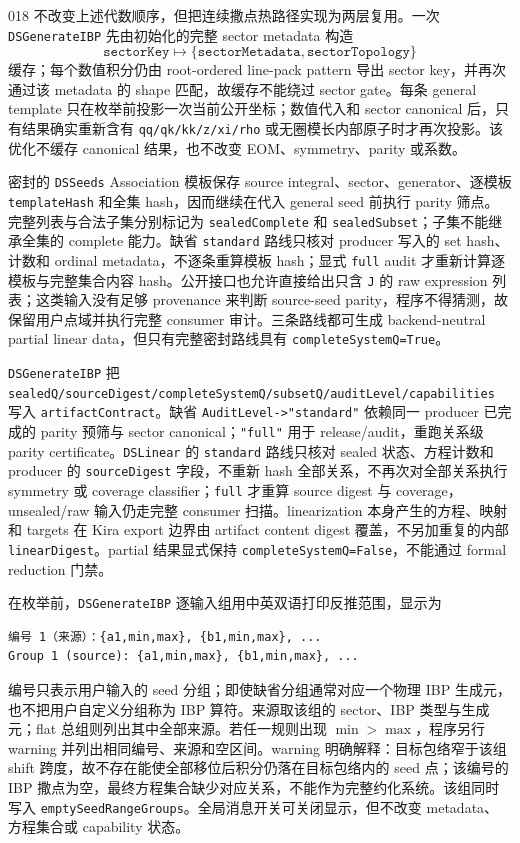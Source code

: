 ﻿\documentclass[a4paper,11pt]{article}
\begin{document}
018 不改变上述代数顺序，但把连续撒点热路径实现为两层复用。一次 \texttt{DSGenerateIBP} 先由初始化的完整 sector metadata 构造
\begin{equation}
 \texttt{sectorKey}\longmapsto\{\texttt{sectorMetadata},\texttt{sectorTopology}\}
\end{equation}
缓存；每个数值积分仍由 root-ordered line-pack pattern 导出 sector key，并再次通过该 metadata 的 shape 匹配，故缓存不能绕过 sector gate。每条 general template 只在枚举前投影一次当前公开坐标；数值代入和 sector canonical 后，只有结果确实重新含有 \texttt{qq/qk/kk/z/xi/rho} 或无圈模长内部原子时才再次投影。该优化不缓存 canonical 结果，也不改变 EOM、symmetry、parity 或系数。

密封的 \texttt{DSSeeds} Association 模板保存 source integral、sector、generator、逐模板 \texttt{templateHash} 和全集 hash，因而继续在代入 general seed 前执行 parity 筛点。完整列表与合法子集分别标记为 \texttt{sealedComplete} 和 \texttt{sealedSubset}；子集不能继承全集的 complete 能力。缺省 \texttt{standard} 路线只核对 producer 写入的 set hash、计数和 ordinal metadata，不逐条重算模板 hash；显式 \texttt{full} audit 才重新计算逐模板与完整集合内容 hash。公开接口也允许直接给出只含 \texttt{J} 的 raw expression 列表；这类输入没有足够 provenance 来判断 source-seed parity，程序不得猜测，故保留用户点域并执行完整 consumer 审计。三条路线都可生成 backend-neutral partial linear data，但只有完整密封路线具有 \texttt{completeSystemQ=True}。

\texttt{DSGenerateIBP} 把 \texttt{sealedQ/sourceDigest/completeSystemQ/subsetQ/auditLevel/capabilities} 写入 \texttt{artifactContract}。缺省 \texttt{AuditLevel->"standard"} 依赖同一 producer 已完成的 parity 预筛与 sector canonical；\texttt{"full"} 用于 release/audit，重跑关系级 parity certificate。\texttt{DSLinear} 的 \texttt{standard} 路线只核对 sealed 状态、方程计数和 producer 的 \texttt{sourceDigest} 字段，不重新 hash 全部关系，不再次对全部关系执行 symmetry 或 coverage classifier；\texttt{full} 才重算 source digest 与 coverage，unsealed/raw 输入仍走完整 consumer 扫描。linearization 本身产生的方程、映射和 targets 在 Kira export 边界由 artifact content digest 覆盖，不另加重复的内部 \texttt{linearDigest}。partial 结果显式保持 \texttt{completeSystemQ=False}，不能通过 formal reduction 门禁。

在枚举前，\texttt{DSGenerateIBP} 逐输入组用中英双语打印反推范围，显示为
\begin{verbatim}
编号 1（来源）：{a1,min,max}, {b1,min,max}, ...
Group 1 (source): {a1,min,max}, {b1,min,max}, ...
\end{verbatim}
编号只表示用户输入的 seed 分组；即使缺省分组通常对应一个物理 IBP 生成元，也不把用户自定义分组称为 IBP 算符。来源取该组的 sector、IBP 类型与生成元；flat 总组则列出其中全部来源。若任一规则出现 $\min>\max$，程序另行 warning 并列出相同编号、来源和空区间。warning 明确解释：目标包络窄于该组 shift 跨度，故不存在能使全部移位后积分仍落在目标包络内的 seed 点；该编号的 IBP 撒点为空，最终方程集合缺少对应关系，不能作为完整约化系统。该组同时写入 \texttt{emptySeedRangeGroups}。全局消息开关可关闭显示，但不改变 metadata、方程集合或 capability 状态。
\end{document}
